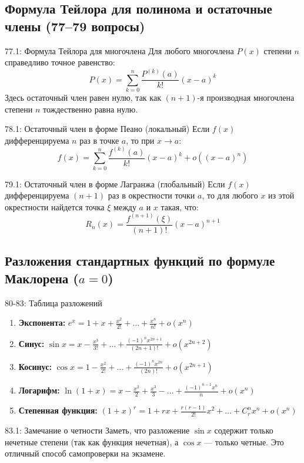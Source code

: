 \documentclass[a4paper,12pt]{article}
\begin{document}
	\subsection{Формула Тейлора для полинома и остаточные члены (77--79 вопросы)}
	
	\begin{theorembox}{77.1: Формула Тейлора для многочлена}
		Для любого многочлена $P(x)$ степени $n$ справедливо точное равенство:
		$$ P(x) = \sum_{k=0}^{n} \frac{P^{(k)}(a)}{k!} (x-a)^k $$
		Здесь остаточный член равен нулю, так как $(n+1)$-я производная многочлена степени $n$ тождественно равна нулю.
	\end{theorembox}
	
	\begin{theorembox}{78.1: Остаточный член в форме Пеано (локальный)}
		Если $f(x)$ дифференцируема $n$ раз в точке $a$, то при $x \to a$:
		$$ f(x) = \sum_{k=0}^{n} \frac{f^{(k)}(a)}{k!} (x-a)^k + o((x-a)^n) $$
	\end{theorembox}
	
	\begin{theorembox}{79.1: Остаточный член в форме Лагранжа (глобальный)}
		Если $f(x)$ дифференцируема $(n+1)$ раз в окрестности точки $a$, то для любого $x$ из этой окрестности найдется точка $\xi$ между $a$ и $x$ такая, что:
		$$ R_n(x) = \frac{f^{(n+1)}(\xi)}{(n+1)!} (x-a)^{n+1} $$
	\end{theorembox}
	
	
	\newpage
	\subsection{Разложения стандартных функций по формуле Маклорена ($a=0$)}
	
	\begin{theorembox}{80-83: Таблица разложений}
		\begin{enumerate}
			\item \textbf{Экспонента:} $e^x = 1 + x + \frac{x^2}{2!} + \dots + \frac{x^n}{n!} + o(x^n)$
			\item \textbf{Синус:} $\sin x = x - \frac{x^3}{3!} + \dots + \frac{(-1)^n x^{2n+1}}{(2n+1)!} + o(x^{2n+2})$
			\item \textbf{Косинус:} $\cos x = 1 - \frac{x^2}{2!} + \dots + \frac{(-1)^n x^{2n}}{(2n)!} + o(x^{2n+1})$
			\item \textbf{Логарифм:} $\ln(1+x) = x - \frac{x^2}{2} + \frac{x^3}{3} - \dots + \frac{(-1)^{n-1} x^n}{n} + o(x^n)$
			\item \textbf{Степенная функция:} $(1+x)^r = 1 + rx + \frac{r(r-1)}{2!}x^2 + \dots + C_r^n x^n + o(x^n)$
		\end{enumerate}
	\end{theorembox}
	
	\begin{notebook}{83.1: Замечание о четности}
		Заметь, что разложение $\sin x$ содержит только нечетные степени (так как функция нечетная), а $\cos x$ — только четные. Это отличный способ самопроверки на экзамене.
	\end{notebook}
	
\end{document}
